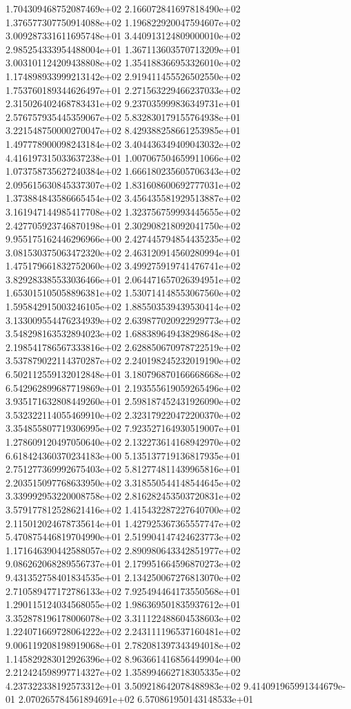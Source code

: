 1.704309468752087469e+02 2.166072841697818490e+02 1.376577307750914088e+02
1.196822920047594607e+02 3.009287331611695748e+01 3.440913124809000010e+02
2.985254333954488004e+01 1.367113603570713209e+01 3.003101124209438808e+02
1.354188366953326010e+02 1.174898933999213142e+02 2.919411455526502550e+02
1.753760189344626497e+01 2.271563229466237033e+02 2.315026402468783431e+02
9.237035999836349731e+01 2.576757935445359067e+02 5.832830179155764938e+01
3.221548750000270047e+02 8.429388258661253985e+01 1.497778900098243184e+02
3.404436349409043032e+02 4.416197315033637238e+01 1.007067504659911066e+02
1.073758735627240384e+02 1.666180235605706343e+02 2.095615630845337307e+02
1.831608600692777031e+02 1.373884843586665454e+02 3.456435581929513887e+02
3.161947144985417708e+02 1.323756759993445655e+02 2.427705923746870198e+01
2.302908218092041750e+02 9.955175162446296966e+00 2.427445794854435235e+02
3.081530375063472320e+02 2.463120914560280994e+01 1.475179661832752060e+02
3.499275919741476741e+02 3.829283385533036466e+01 2.064471657026394951e+02
1.653015105058896381e+02 1.530714148553067560e+02 1.595842915003246105e+02
1.885503539439530414e+02 3.133009554476234939e+02 2.639877020922929773e+02
3.548298163532894023e+02 1.688389649438298648e+02 2.198541786567333816e+02
2.628850670978722519e+02 3.537879022114370287e+02 2.240198245232019190e+02
6.502112559132012848e+01 3.180796870166668668e+02 6.542962899687719869e+01
2.193555619059265496e+02 3.935171632808449260e+01 2.598187452431926090e+02
3.532322114055469910e+02 2.323179220472200370e+02 3.354855807719306995e+02
7.923527164930519007e+01 1.278609120497050640e+02 2.132273614168942970e+02
6.618424360370234183e+00 5.135137719136817935e+01 2.751277369992675403e+02
5.812774811439965816e+01 2.203515097768633950e+02 3.318550544148544645e+02
3.339992953220008758e+02 2.816282453503720831e+02 3.579177812528621416e+02
1.415432287227640700e+02 2.115012024678735614e+01 1.427925367365557747e+02
5.470875446819704990e+01 2.519904147424623773e+02 1.171646390442588057e+02
2.890980643342851977e+02 9.086262068289556737e+01 2.179951664596870273e+02
9.431352758401834535e+01 2.134250067276813070e+02 2.710589477172786133e+02
7.925494464173550568e+01 1.290115124034568055e+02 1.986369501835937612e+01
3.352878196178006078e+02 3.311122488604538603e+02 1.224071669728064222e+02
2.243111196537160481e+02 9.006119208198919068e+01 2.782081397343494018e+02
1.145829283012926396e+02 8.963661416856449904e+00 2.212424598997714327e+02
1.358994662718305335e+02 4.237322338192573312e+01 3.509218642078488983e+02
9.414091965991344679e-01 2.070265784561894691e+02 6.570861950143148533e+01
